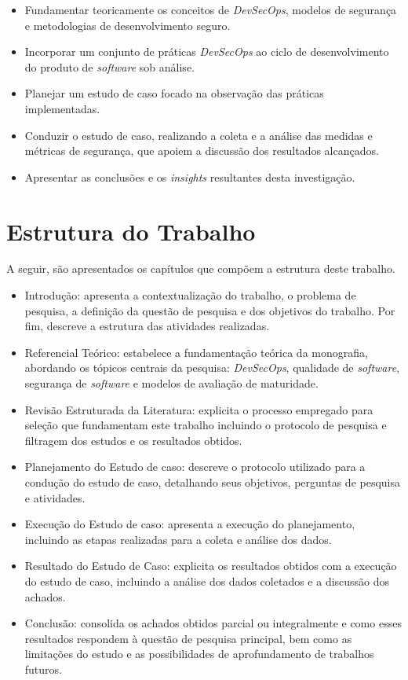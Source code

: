 \begin{itemize}
    \item Fundamentar teoricamente os conceitos de \textit{DevSecOps}, modelos de segurança e metodologias de desenvolvimento seguro.
    \item Incorporar um conjunto de práticas \textit{DevSecOps} ao ciclo de desenvolvimento do produto de \textit{software} sob análise.
    \item Planejar um estudo de caso focado na observação das práticas implementadas.
    \item Conduzir o estudo de caso, realizando a coleta e a análise das medidas e métricas de segurança, que apoiem a discussão dos resultados alcançados.
    \item Apresentar as conclusões e os \textit{insights} resultantes desta investigação.
\end{itemize}

\section{Estrutura do Trabalho}
\label{sec:estrutura-trabalho}

A seguir, são apresentados os capítulos que compõem a estrutura deste trabalho.

\begin{itemize}
    \item Introdução: apresenta a contextualização do trabalho, o problema de pesquisa, a definição da questão de pesquisa e dos objetivos do trabalho. Por fim, descreve a estrutura das atividades realizadas.
    \item Referencial Teórico: estabelece a fundamentação teórica da monografia, abordando os tópicos centrais da pesquisa: \textit{DevSecOps}, qualidade de \textit{software}, segurança de \textit{software} e modelos de avaliação de maturidade.
    \item Revisão Estruturada da Literatura: explicita o processo empregado para seleção que fundamentam este trabalho incluindo o protocolo de pesquisa e filtragem dos estudos e os resultados obtidos.
    \item Planejamento do Estudo de caso: descreve o protocolo utilizado para a condução do estudo de caso, detalhando seus objetivos, perguntas de pesquisa e atividades.
    \item Execução do Estudo de caso: apresenta a execução do planejamento, incluindo as etapas realizadas para a coleta e análise dos dados.
    \item Resultado do Estudo de Caso: explicita os resultados obtidos com a execução do estudo de caso, incluindo a análise dos dados coletados e a discussão dos achados.
    \item Conclusão: consolida os achados obtidos parcial ou integralmente e como esses resultados respondem à questão de pesquisa principal, bem como as limitações do estudo e as possibilidades de aprofundamento de trabalhos futuros.
\end{itemize}

